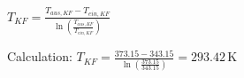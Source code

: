 \( T_{KF} = \frac{T_{aus,KF} - T_{ein,KF}}{\ln \left( \frac{T_{aus,KF}}{T_{ein,KF}} \right)} \)  

Calculation:  
\( T_{KF} = \frac{373.15 - 343.15}{\ln \left( \frac{373.15}{343.15} \right)} = 293.42 \, \text{K} \)